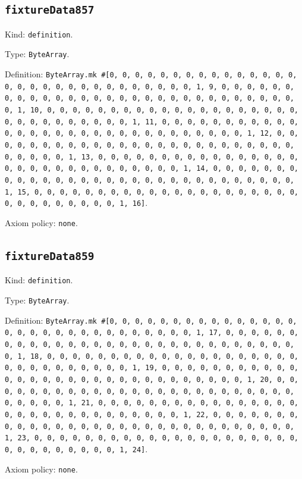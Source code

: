 \documentclass[11pt]{article}
\begin{document}
\subsection*{\texttt{fixtureData857}}
\noindent Kind: \texttt{definition}.\par
\noindent Type: \texttt{ByteArray}.\par
\noindent Definition: \texttt{ByteArray.mk \#[0, 0, 0, 0, 0, 0, 0, 0, 0, 0, 0, 0, 0, 0, 0, 0, 0, 0, 0, 0, 0, 0, 0, 0, 0, 0, 0, 0, 0, 0, 1, 9, 0, 0, 0, 0, 0, 0, 0, 0, 0, 0, 0, 0, 0, 0, 0, 0, 0, 0, 0, 0, 0, 0, 0, 0, 0, 0, 0, 0, 0, 0, 1, 10, 0, 0, 0, 0, 0, 0, 0, 0, 0, 0, 0, 0, 0, 0, 0, 0, 0, 0, 0, 0, 0, 0, 0, 0, 0, 0, 0, 0, 0, 0, 1, 11, 0, 0, 0, 0, 0, 0, 0, 0, 0, 0, 0, 0, 0, 0, 0, 0, 0, 0, 0, 0, 0, 0, 0, 0, 0, 0, 0, 0, 0, 0, 1, 12, 0, 0, 0, 0, 0, 0, 0, 0, 0, 0, 0, 0, 0, 0, 0, 0, 0, 0, 0, 0, 0, 0, 0, 0, 0, 0, 0, 0, 0, 0, 1, 13, 0, 0, 0, 0, 0, 0, 0, 0, 0, 0, 0, 0, 0, 0, 0, 0, 0, 0, 0, 0, 0, 0, 0, 0, 0, 0, 0, 0, 0, 0, 1, 14, 0, 0, 0, 0, 0, 0, 0, 0, 0, 0, 0, 0, 0, 0, 0, 0, 0, 0, 0, 0, 0, 0, 0, 0, 0, 0, 0, 0, 0, 0, 1, 15, 0, 0, 0, 0, 0, 0, 0, 0, 0, 0, 0, 0, 0, 0, 0, 0, 0, 0, 0, 0, 0, 0, 0, 0, 0, 0, 0, 0, 0, 0, 1, 16]}.\par
\noindent Axiom policy: \texttt{none}.\par
\subsection*{\texttt{fixtureData859}}
\noindent Kind: \texttt{definition}.\par
\noindent Type: \texttt{ByteArray}.\par
\noindent Definition: \texttt{ByteArray.mk \#[0, 0, 0, 0, 0, 0, 0, 0, 0, 0, 0, 0, 0, 0, 0, 0, 0, 0, 0, 0, 0, 0, 0, 0, 0, 0, 0, 0, 0, 0, 1, 17, 0, 0, 0, 0, 0, 0, 0, 0, 0, 0, 0, 0, 0, 0, 0, 0, 0, 0, 0, 0, 0, 0, 0, 0, 0, 0, 0, 0, 0, 0, 1, 18, 0, 0, 0, 0, 0, 0, 0, 0, 0, 0, 0, 0, 0, 0, 0, 0, 0, 0, 0, 0, 0, 0, 0, 0, 0, 0, 0, 0, 0, 0, 1, 19, 0, 0, 0, 0, 0, 0, 0, 0, 0, 0, 0, 0, 0, 0, 0, 0, 0, 0, 0, 0, 0, 0, 0, 0, 0, 0, 0, 0, 0, 0, 1, 20, 0, 0, 0, 0, 0, 0, 0, 0, 0, 0, 0, 0, 0, 0, 0, 0, 0, 0, 0, 0, 0, 0, 0, 0, 0, 0, 0, 0, 0, 0, 1, 21, 0, 0, 0, 0, 0, 0, 0, 0, 0, 0, 0, 0, 0, 0, 0, 0, 0, 0, 0, 0, 0, 0, 0, 0, 0, 0, 0, 0, 0, 0, 1, 22, 0, 0, 0, 0, 0, 0, 0, 0, 0, 0, 0, 0, 0, 0, 0, 0, 0, 0, 0, 0, 0, 0, 0, 0, 0, 0, 0, 0, 0, 0, 1, 23, 0, 0, 0, 0, 0, 0, 0, 0, 0, 0, 0, 0, 0, 0, 0, 0, 0, 0, 0, 0, 0, 0, 0, 0, 0, 0, 0, 0, 0, 0, 1, 24]}.\par
\noindent Axiom policy: \texttt{none}.\par
\end{document}
